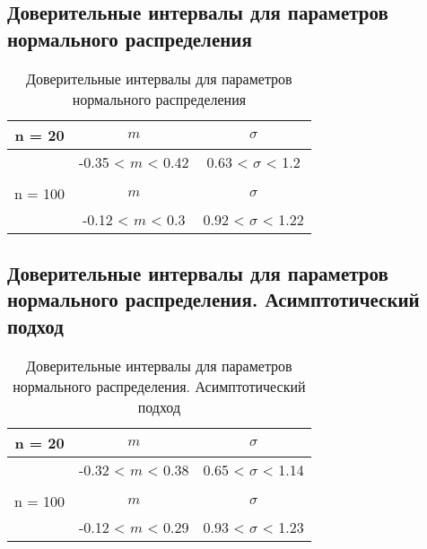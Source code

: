 \documentclass[../body.tex]{subfiles}
\begin{document}
		\subsection{Доверительные интервалы для параметров нормального распределения}
	\begin{table}[H]
		\centering
		\begin{tabular}{| c | c | c |}
			\hline
			n = 20   &  $m$  & $\sigma$\\ \hline
			&  -0.35 < $m$ < 0.42 & 0.63 < $\sigma$ < 1.2 \\ \hline
			&   &   \\ \hline
			n = 100   &  $m$  & $\sigma$\\ \hline
			& -0.12 < $m$ < 0.3 & 0.92 < $\sigma$ < 1.22 \\
			\hline
		\end{tabular}
		\caption{Доверительные интервалы для параметров нормального распределения}
		\label{tab:interv_simple}
	\end{table}
	
	\subsection{Доверительные интервалы для параметров нормального распределения. Асимптотический подход}
	\begin{table}[H]
		\centering
		\begin{tabular}{| c | c | c |}
			\hline
			n = 20   &  $m$  & $\sigma$\\ \hline
			& -0.32 < $m$ < 0.38 & 0.65 < $\sigma$ < 1.14 \\ \hline
			&   &   \\ \hline
			n = 100   &  $m$  & $\sigma$\\ \hline
			& -0.12 < $m$ < 0.29 & 0.93 < $\sigma$ < 1.23 \\
			\hline
		\end{tabular}
		\caption{Доверительные интервалы для параметров нормального распределения. Асимптотический подход}
		\label{tab:interv_asimpt}
	\end{table}
	
\end{document}
